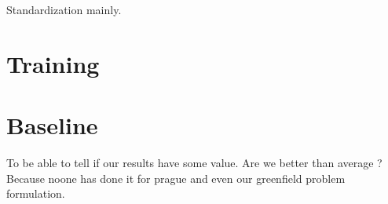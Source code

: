 Standardization mainly.

\section{Training}


\section{Baseline}

To be able to tell if our results have some value.
Are we better than average ? Because noone has done it for prague and even our greenfield problem formulation.